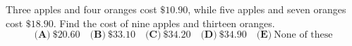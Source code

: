 Three apples and four oranges cost $\$10.90$, while five apples and seven oranges cost $\$18.90$. Find the cost of nine apples and thirteen oranges.
\[\textbf{(A)}\ \$20.60\quad\textbf{(B)}\ \$33.10\quad\textbf{(C)}\ \$34.20\quad\textbf{(D)}\ \$34.90\quad\textbf{(E)}\ \text{None of these}\]
